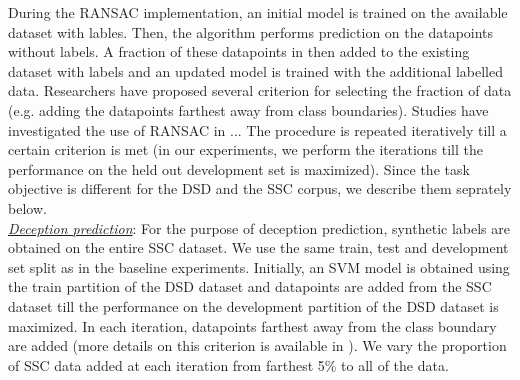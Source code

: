\documentclass{article}
\begin{document}
During the RANSAC \cite{} implementation, an initial model is trained on the available dataset with lables.
Then, the algorithm performs prediction on the datapoints without labels.
A fraction of these datapoints in then added to the existing dataset with labels and an updated model is trained with the additional labelled data.
Researchers have proposed several criterion for selecting the fraction of data (e.g. adding the datapoints farthest away from class boundaries).
Studies have investigated the use of RANSAC in ... 
The procedure is repeated iteratively till a certain criterion is met (in our experiments, we perform the iterations till the performance on the held out development set is maximized).
Since the task objective is different for the DSD and the SSC corpus, we describe them seprately below. 
\\

\noindent\underline{\it Deception prediction}:  
For the purpose of deception prediction, synthetic labels are obtained on the entire SSC dataset.
We use the same train, test and development set split as in the baseline experiments.
Initially, an SVM model is obtained using the train partition of the DSD dataset and datapoints are added from the SSC dataset till the performance on the development partition of the DSD dataset is maximized.
In each iteration, datapoints farthest away from the class boundary are added (more details on this criterion is available in \cite{}).
We vary the proportion of SSC data added at each iteration from farthest 5\% to all of the data.
\\
\end{document}
